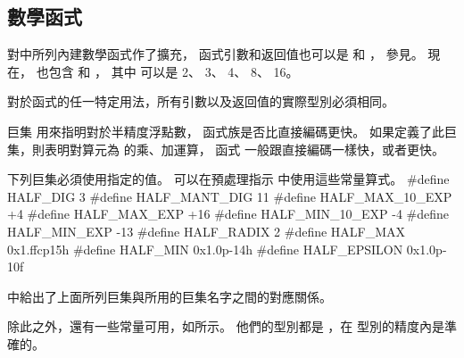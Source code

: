 \subsection{數學函式}

對中所列內建數學函式作了擴充，
函式引數和返回值也可以是  和 ，
參見。
現在，  也包含  和 ，
其中  可以是 2、 3、 4、 8、 16。

對於函式的任一特定用法，所有引數以及返回值的實際型別必須相同。

{}

巨集  用來指明對於半精度浮點數，
  函式族是否比直接編碼更快。
如果定義了此巨集，則表明對算元為  的乘、加運算，
函式  一般跟直接編碼一樣快，或者更快。

下列巨集必須使用指定的值。
可以在預處理指示  中使用這些常量算式。
\startclc
#define HALF_DIG		3
#define HALF_MANT_DIG		11
#define HALF_MAX_10_EXP		+4
#define HALF_MAX_EXP		+16
#define HALF_MIN_10_EXP		-4
#define HALF_MIN_EXP		-13
#define HALF_RADIX		2
#define HALF_MAX		0x1.ffcp15h
#define HALF_MIN		0x1.0p-14h
#define HALF_EPSILON		0x1.0p-10f
\stopclc

中給出了上面所列巨集與所用的巨集名字之間的對應關係。

{}

除此之外，還有一些常量可用，如所示。
他們的型別都是 ，在  型別的精度內是準確的。

{}
